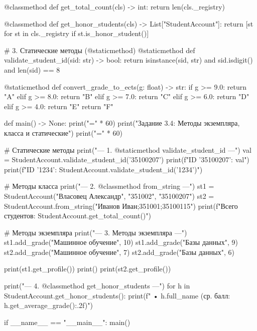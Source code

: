 \documentclass[14pt,a4paper]{extarticle}
\begin{document}
\begin{CodeListing}
    @classmethod
    def get_total_count(cls) -> int:
        return len(cls._registry)

    @classmethod
    def get_honor_students(cls) -> List["StudentAccount"]:
        return [st for st in cls._registry if st.is_honor_student()]

    # 3. Статические методы (@staticmethod)
    @staticmethod
    def validate_student_id(sid: str) -> bool:
        return isinstance(sid, str) and sid.isdigit() and len(sid) == 8

    @staticmethod
    def convert_grade_to_ects(g: float) -> str:
        if g >= 9.0:
            return "A"
        elif g >= 8.0:
            return "B"
        elif g >= 7.0:
            return "C"
        elif g >= 6.0:
            return "D"
        elif g >= 4.0:
            return "E"
        return "F"


def main() -> None:
    print("=" * 60)
    print("Задание 3.4: Методы экземпляра, класса и статические")
    print("=" * 60)

    # Статические методы
    print("\n--- 1. @staticmethod validate_student_id ---")
    val = StudentAccount.validate_student_id('35100207')
    print(f"ID '35100207': {val}")
    print(f"ID '1234':     {StudentAccount.validate_student_id('1234')}")

    # Методы класса
    print("\n--- 2. @classmethod from_string ---")
    st1 = StudentAccount("Власовец Александр", "351002", "35100207")
    st2 = StudentAccount.from_string("Иванов Иван;351001;35100115")
    print(f"Всего студентов: {StudentAccount.get_total_count()}")

    # Методы экземпляра
    print("\n--- 3. Методы экземпляра ---")
    st1.add_grade("Машинное обучение", 10)
    st1.add_grade("Базы данных", 9)
    st2.add_grade("Машинное обучение", 7)
    st2.add_grade("Базы данных", 6)

    print(st1.get_profile())
    print()
    print(st2.get_profile())

    print("\n--- 4. @classmethod get_honor_students ---")
    for h in StudentAccount.get_honor_students():
        print(f"  • {h.full_name} (ср. балл: {h.get_average_grade():.2f})")


if __name__ == "__main__":
    main()
\end{CodeListing}

\end{document}
